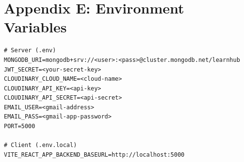 \documentclass[12pt,a4paper]{report}
\begin{document}
\section{Appendix E: Environment Variables}
\begin{lstlisting}[language={}, caption={Required Environment Variables (.env)}]
# Server (.env)
MONGODB_URI=mongodb+srv://<user>:<pass>@cluster.mongodb.net/learnhub
JWT_SECRET=<your-secret-key>
CLOUDINARY_CLOUD_NAME=<cloud-name>
CLOUDINARY_API_KEY=<api-key>
CLOUDINARY_API_SECRET=<api-secret>
EMAIL_USER=<gmail-address>
EMAIL_PASS=<gmail-app-password>
PORT=5000

# Client (.env.local)
VITE_REACT_APP_BACKEND_BASEURL=http://localhost:5000
\end{lstlisting}
\end{document}
